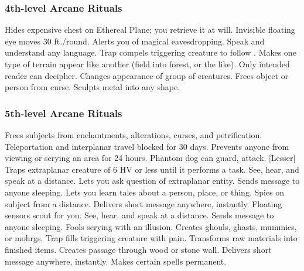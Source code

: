\subsubsection{4th-level Arcane Rituals}
\begin{rituallist}
    \F Hides expensive chest on Ethereal Plane; you retrieve it at will.
     Invisible floating eye moves 30 ft./round.
     Alerts you of magical eavesdropping.
     Speak and understand any language.
     Trap compels triggering creature to follow .
     Makes one type of terrain appear like another (field into forest, or the like).
     Only intended reader can decipher.
     Changes appearance of group of creatures.
     Frees object or person from curse.
     Sculpts metal into any shape.
\end{rituallist}

\subsubsection{5th-level Arcane Rituals}
\begin{rituallist}
     Frees subjects from enchantments, alterations, curses, and petrification.
     Teleportation and interplanar travel blocked for 30 days.
     Prevents anyone from viewing or scrying an area for 24 hours.
     Phantom dog can guard, attack.
    [Lesser] Traps extraplanar creature of 6 HV or less until it performs a task.
     See, hear, and speak at a distance.
     Lets you ask question of extraplanar entity.
     Sends message to anyone sleeping.
    \F Lets you learn tales about a person, place, or thing.
    \F Spies on subject from a distance.
     Delivers short message anywhere, instantly.
     Floating sensors scout for you.
     See, hear, and speak at a distance.
     Sends message to anyone sleeping.
     Fools scrying with an illusion.
     Creates ghouls, ghasts, mummies, or mohrgs.
     Trap fills triggering creature with pain.
     Transforms raw materials into finished items.
     Creates passage through wood or stone wall.
     Delivers short message anywhere, instantly.
     Makes certain spells permanent.
\end{rituallist}

